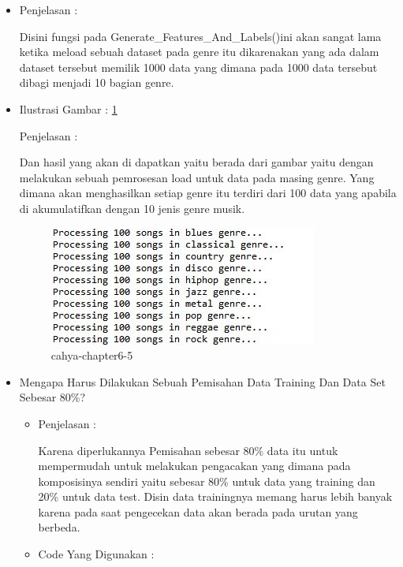 \begin{enumerate}
\begin{itemize}
\par
\par
\item Penjelasan : 
\par Disini fungsi pada Generate\_Features\_And\_Labels()ini akan sangat lama ketika meload sebuah dataset pada genre itu dikarenakan yang ada dalam dataset tersebut memilik 1000 data yang dimana pada 1000 data tersebut dibagi menjadi 10 bagian genre. 
\par
\item Ilustrasi Gambar : \ref{cahya-chapter6-5}
\par Penjelasan :
\par Dan hasil yang akan di dapatkan yaitu berada dari gambar yaitu dengan melakukan sebuah pemrosesan load untuk data pada masing genre. Yang dimana akan menghasilkan setiap genre itu terdiri dari 100 data yang apabila di akumulatifkan dengan 10 jenis genre musik.
\begin{figure}[!hbtp]
\centering
\includegraphics[scale=0.2]{figures/cahya-chapter6-5.jpg}
\caption{cahya-chapter6-5}
\label{cahya-chapter6-5}
\end{figure}
\par
\par
\par
\par
\item Mengapa Harus Dilakukan Sebuah Pemisahan Data Training Dan Data Set Sebesar 80\%?
\begin{itemize}
\item Penjelasan :
\par Karena diperlukannya Pemisahan sebesar 80\% data itu untuk mempermudah untuk melakukan pengacakan yang dimana pada komposisinya sendiri yaitu sebesar 80\% untuk data yang training dan 20\% untuk data test. Disin data trainingnya memang harus lebih banyak karena pada saat pengecekan data akan berada pada urutan yang berbeda. 
\par
\par
\item Code Yang Digunakan :
\par


\end{itemize}
\end{itemize}
\end{enumerate}
